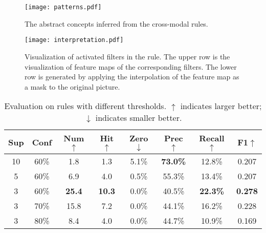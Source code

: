 \documentclass[sigconf]{acmart}
\begin{document}
\begin{figure*}[t] 
\centering 
\centerline{\texttt{[image: patterns.pdf]}} 
\caption{The abstract concepts inferred from the cross-modal rules.} 
\label{figure4}
\end{figure*}

\begin{figure*}[t] 
\centering 
\centerline{\texttt{[image: interpretation.pdf]}} 
\caption{Visualization of activated filters in the rule. The upper row is the visualization of feature maps of the corresponding filters. The lower row is generated by applying the interpolation of the feature map as a mask to the original picture.} 
\label{figure5}
\end{figure*}

\begin{table}[t]
\centering
\caption{Evaluation on rules with different thresholds. $\uparrow$ indicates larger better; $\downarrow$ indicates smaller better.}
\begin{tabular}{cccccccc}
\toprule
Sup&Conf&Num$\uparrow$&Hit$\uparrow$&Zero$\downarrow$&Prec$\uparrow$&Recall$\uparrow$&F1$\uparrow$\\
\midrule
10&60\%&1.8&1.3&5.1\%&\textbf{73.0\%}&12.8\%&0.207\\
5&60\%&6.9&4.0&0.5\%&55.3\%&13.4\%&0.207\\
3&60\%&\textbf{25.4}&\textbf{10.3}&0.0\%&40.5\%&\textbf{22.3\%}&\textbf{0.278}\\
3&70\%&15.8&7.2&0.0\%&44.1\%&16.2\%&0.228\\
3&80\%&8.4&4.0&0.0\%&44.7\%&10.9\%&0.169\\
\bottomrule
\end{tabular}
\setlength{\belowcaptionskip}{10pt}
\label{table1}
\end{table}
\end{document}
